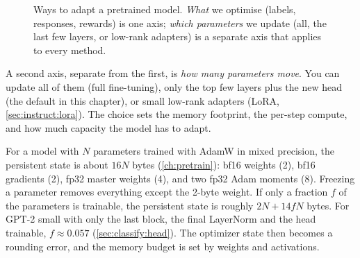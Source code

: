 \begin{figure}[ht]
\centering
{}
\caption{Ways to adapt a pretrained model. \emph{What} we optimise (labels, responses,
rewards) is one axis; \emph{which parameters} we update (all, the last few layers, or
low-rank adapters) is a separate axis that applies to every method.}
\label{fig:classify:landscape}
\end{figure}

A second axis, separate from the first, is \emph{how many parameters move}. You can update
all of them (full fine-tuning), only the top few layers plus the new head (the default
in this chapter), or small low-rank adapters (LoRA, \cref{sec:instruct:lora}). The
choice sets the memory footprint, the per-step compute, and how much capacity the model
has to adapt.

\begin{systemslens}
For a model with $N$ parameters trained with AdamW in mixed precision, the persistent
state is about $16N$ bytes (\cref{ch:pretrain}): bf16 weights (2), bf16 gradients (2),
fp32 master weights (4), and two fp32 Adam moments (8). Freezing a parameter removes
everything except the 2-byte weight. If only a fraction $f$ of the parameters is
trainable, the persistent state is roughly $2N + 14fN$ bytes. For GPT-2 small with only
the last block, the final LayerNorm and the head trainable, $f\approx 0.057$
(\cref{sec:classify:head}). The optimizer state then becomes a rounding error, and the
memory budget is set by weights and activations.
\end{systemslens}

